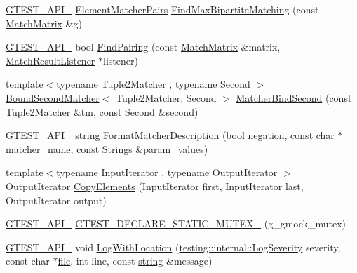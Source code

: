 \begin{DoxyCompactItemize}
\item 
\hyperlink{gtest-port_8h_aa73be6f0ba4a7456180a94904ce17790}{G\+T\+E\+S\+T\+\_\+\+A\+P\+I\+\_\+} \hyperlink{namespacetesting_1_1internal_a0038618710c01a71150887dc7cfb0a29}{Element\+Matcher\+Pairs} \hyperlink{namespacetesting_1_1internal_ae30bd8357c179334b2b09b0d689efccc}{Find\+Max\+Bipartite\+Matching} (const \hyperlink{classtesting_1_1internal_1_1_match_matrix}{Match\+Matrix} \&g)
\item 
\hyperlink{gtest-port_8h_aa73be6f0ba4a7456180a94904ce17790}{G\+T\+E\+S\+T\+\_\+\+A\+P\+I\+\_\+} bool \hyperlink{namespacetesting_1_1internal_af2bd2e350b56422a3d9d3b986ac1df0e}{Find\+Pairing} (const \hyperlink{classtesting_1_1internal_1_1_match_matrix}{Match\+Matrix} \&matrix, \hyperlink{classtesting_1_1_match_result_listener}{Match\+Result\+Listener} $\ast$listener)
\item 
{\footnotesize template$<$typename Tuple2\+Matcher , typename Second $>$ }\\\hyperlink{classtesting_1_1internal_1_1_bound_second_matcher}{Bound\+Second\+Matcher}$<$ Tuple2\+Matcher, Second $>$ \hyperlink{namespacetesting_1_1internal_a31eb77a2bb0ca713d6ef07d8a3b9af9e}{Matcher\+Bind\+Second} (const Tuple2\+Matcher \&tm, const Second \&second)
\item 
\hyperlink{gtest-port_8h_aa73be6f0ba4a7456180a94904ce17790}{G\+T\+E\+S\+T\+\_\+\+A\+P\+I\+\_\+} \hyperlink{namespacetesting_1_1internal_a8e8ff5b11e64078831112677156cb111}{string} \hyperlink{namespacetesting_1_1internal_a593b52fcbb46a765a31850661b1960f4}{Format\+Matcher\+Description} (bool negation, const char $\ast$matcher\+\_\+name, const \hyperlink{namespacetesting_1_1internal_a7706b17f05f4b49e351b052ae4e05073}{Strings} \&param\+\_\+values)
\item 
{\footnotesize template$<$typename Input\+Iterator , typename Output\+Iterator $>$ }\\Output\+Iterator \hyperlink{namespacetesting_1_1internal_a9372c12747bcf964aacb1284f8048cae}{Copy\+Elements} (Input\+Iterator first, Input\+Iterator last, Output\+Iterator output)
\item 
\hyperlink{gtest-port_8h_aa73be6f0ba4a7456180a94904ce17790}{G\+T\+E\+S\+T\+\_\+\+A\+P\+I\+\_\+} \hyperlink{namespacetesting_1_1internal_ae4d273e9b76b40a28483826518e68f17}{G\+T\+E\+S\+T\+\_\+\+D\+E\+C\+L\+A\+R\+E\+\_\+\+S\+T\+A\+T\+I\+C\+\_\+\+M\+U\+T\+E\+X\+\_\+} (g\+\_\+gmock\+\_\+mutex)
\item 
\hyperlink{gtest-port_8h_aa73be6f0ba4a7456180a94904ce17790}{G\+T\+E\+S\+T\+\_\+\+A\+P\+I\+\_\+} void \hyperlink{namespacetesting_1_1internal_af271cd1fc0b62a7f4736cb3109e86a37}{Log\+With\+Location} (\hyperlink{namespacetesting_1_1internal_a203d1a8a2147a53d12bbdae40d443914}{testing\+::internal\+::\+Log\+Severity} severity, const char $\ast$\hyperlink{_07copy_08_2_read_camera_model_8m_a151631b2fd2bb776ef06c9f440a7ed74}{file}, int line, const \hyperlink{namespacetesting_1_1internal_a8e8ff5b11e64078831112677156cb111}{string} \&message)

\end{DoxyCompactItemize}
